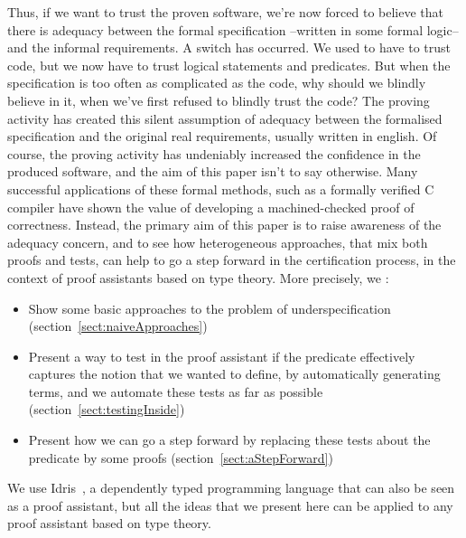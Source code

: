 Thus, if we want to trust the proven software, we're now forced to believe that there is adequacy between the formal specification --written in some formal logic-- and the informal requirements. A switch has occurred. We used to have to trust code, but we now have to trust logical statements and predicates. But when the specification is too often as complicated as the code, why should we blindly believe in it, when we've first refused to blindly trust the code? The proving activity has created this silent assumption of adequacy between the formalised specification and the original real requirements, usually written in english. Of course, the proving activity has undeniably increased the confidence in the produced software, and the aim of this paper isn't to say otherwise. Many successful applications of these formal methods, such as a formally verified C compiler \cite{Leroy09} have shown the value of developing a machined-checked proof of correctness. Instead, the primary aim of this paper is to raise awareness of the adequacy concern, and to see how heterogeneous approaches, that mix both proofs and tests, can help to go a step forward in the certification process, in the context of proof assistants based on type theory.
More precisely, we :
\begin{itemize}
	\item Show some basic approaches to the problem of underspecification (section~\ref{sect:naiveApproaches})
	\item Present a way to test in the proof assistant if the predicate effectively captures the notion that we wanted to define, by automatically generating terms, and we automate these tests as far as possible (section~\ref{sect:testingInside})
	\item Present how we can go a step forward by replacing these tests about the predicate by some proofs (section~\ref{sect:aStepForward})
\end{itemize}

We use Idris~\cite{brady2013idris}, a dependently typed programming language that can also be seen as a proof assistant, but all the ideas that we present here can be applied to any proof assistant based on type theory.

